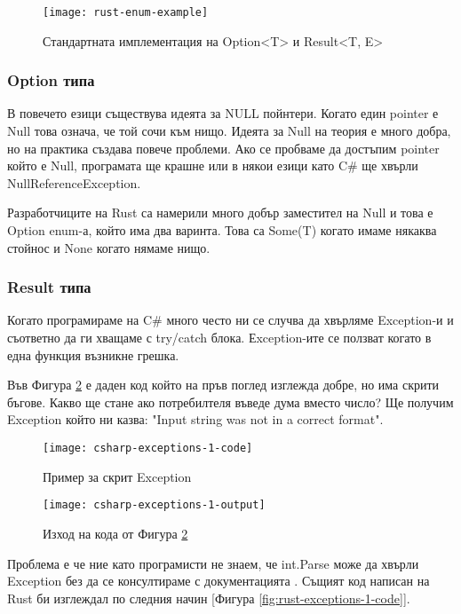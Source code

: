 \begin{figure}[!htb]
  \texttt{[image: rust-enum-example]}
  \centering
  \caption{Стандартната имплементация на Option<T> и Result<T, E>}
  \label{fig:rust-enum-example}
\end{figure}

\subsubsection{Option типа}
В повечето езици съществува идеята за NULL пойнтери. Когато един pointer е Null
това означа, че той сочи към нищо. Идеята за Null на теория е много добра, но
на практика създава повече проблеми. Ако се пробваме да достъпим pointer който
е Null, програмата ще крашне или в някои езици като C\# ще хвърли
NullReferenceException.

Разработчиците на Rust са намерили много добър заместител на Null и това е
Option enum-а, който има два варинта. Това са Some(T) когато имаме някаква
стойнос и None когато нямаме нищо.

\subsubsection{Result типа}
Когато програмираме на C\# много често ни се случва да хвърляме Exception-и и
съответно да ги хващаме с try/catch блока. Еxception-ите се ползват когато в
една функция възникне грешка.

Във Фигура \ref{fig:csharp-exceptions-1-code} е даден код който на пръв поглед
изглежда добре, но има скрити бъгове. Какво ще стане ако потребилтеля въведе
дума вместо число? Ще получим Exception който ни казва: "Input string was not
in a correct format".
\begin{figure}[!htb]
  \texttt{[image: csharp-exceptions-1-code]}
  \centering
  \caption{Пример за скрит Exception}
  \label{fig:csharp-exceptions-1-code}
\end{figure}

\newpage

\begin{figure}[!htb]
  \texttt{[image: csharp-exceptions-1-output]}
  \centering
  \caption{Изход на кода от Фигура \ref{fig:csharp-exceptions-1-code}}
  \label{fig:csharp-exceptions-1-output}
\end{figure}

Проблема е че ние като програмисти не знаем, че int.Parse може да хвърли
Exception без да се консултираме с документацията \cite{CSharp_Int_Parse}.
Същият код написан на Rust би изглеждал по следния начин [Фигура \ref{fig:rust-exceptions-1-code}].

